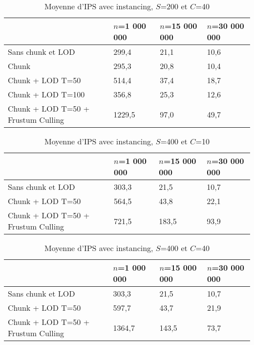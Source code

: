 \begin{table}[H]
	\centering
	\begin{tabular}{|l|l|l|l|}
		\hline
		
											& $n$=1 000 000	& $n$=15 000 000 	& $n$=30 000 000 	\\ \hline
		Sans chunk et LOD					& 299,4			& 21,1         		& 10,6				\\
		Chunk								& 295,3			& 20,8         		& 10,4				\\
		Chunk + LOD T=50					& 514,4			& 37,4         		& 18,7				\\
		Chunk + LOD T=100					& 356,8			& 25,3				& 12,6				\\
		Chunk + LOD T=50 + Frustum Culling	&	1229,5		& 97,0				& 49,7				\\ \hline
	\end{tabular}
	\caption{Moyenne d'IPS avec instancing, $S$=200 et $C$=40}
	\label{tab:tabPerf3}
\end{table}


\begin{table}[H]
	\centering
	\begin{tabular}{|l|l|l|l|}
		\hline
		
											& $n$=1 000 000		& $n$=15 000 000 	& $n$=30 000 000 	\\ \hline
		Sans chunk et LOD			 		& 303,3				& 21,5         		& 10,7				\\
		Chunk + LOD T=50					& 564,5				& 43,8         		& 22,1				\\
		Chunk + LOD T=50 + Frustum Culling	& 721,5				& 183,5				& 93,9				\\ \hline
	\end{tabular}
	\caption{Moyenne d'IPS avec instancing, $S$=400 et $C$=10}
	\label{tab:tabPerf4}
\end{table}


\begin{table}[H]
	\centering
	\begin{tabular}{|l|l|l|l|}
		\hline
		
											& $n$=1 000 000	& $n$=15 000 000 	& $n$=30 000 000 	\\ \hline
		Sans chunk et LOD					& 303,3			& 21,5         		& 10,7				\\
		Chunk + LOD T=50					& 597,7			& 43,7         		& 21,9				\\
		Chunk + LOD T=50 + Frustum Culling	&	1364,7		& 143,5				& 73,7					\\ \hline
	\end{tabular}
	\caption{Moyenne d'IPS avec instancing, $S$=400 et $C$=40}
	\label{tab:tabPerf5}
\end{table}














